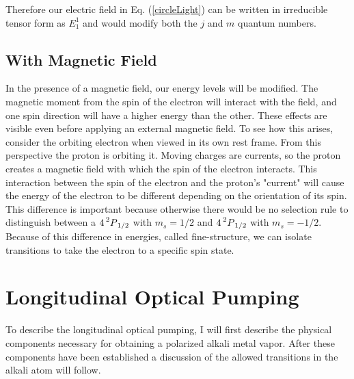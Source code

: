\documentclass[12pt]{article}
\begin{document}
		Therefore our electric field in Eq. (\ref{circleLight}) can
		be written in irreducible tensor form as $E^{1}_1$ and 
		would modify both the $j$ and $m$ 
		quantum numbers.
\subsection{With Magnetic Field}
	In the presence of a magnetic field, our energy levels will be modified.
	The magnetic moment from the spin of the electron will interact
	with the field, and one spin direction will have a 
	higher energy than the other. These effects are
	visible even before applying an external 
	magnetic field. To see how this arises, 
	consider the orbiting electron
	when viewed in its own rest frame. From this
	perspective the  
	proton is orbiting it. Moving charges
	are currents, so the proton creates a
	magnetic field with which the spin of the electron 
	interacts. This interaction between the spin of the 
	electron and the proton's "current" will cause
	the energy of the electron to be different depending
	on the orientation of its spin. This difference is 
	important because otherwise there would be no 
	selection rule to distinguish
	between a $4\prescript{2}{}P_{1/2}$ with 
	$m_s=1/2$ and $4\prescript{2}{}P_{1/2}$ with $m_s=-1/2$.
	Because of this difference in energies, called 
	fine-structure, we can isolate transitions to take
	the electron to a specific spin state.

%

\section{Longitudinal Optical Pumping}
To describe the longitudinal optical pumping, I will
first describe the physical components necessary for
obtaining a polarized alkali metal vapor. After these 
components have been established a discussion of the 
allowed transitions in the alkali atom will follow. 
\end{document}
